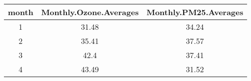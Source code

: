 \documentclass[]{article}
\begin{document}
\begin{longtable}[]{@{}ccc@{}}
\toprule
\begin{minipage}[b]{0.10\columnwidth}\centering\strut
month\strut
\end{minipage} & \begin{minipage}[b]{0.32\columnwidth}\centering\strut
Monthly.Ozone.Averages\strut
\end{minipage} & \begin{minipage}[b]{0.32\columnwidth}\centering\strut
Monthly.PM25.Averages\strut
\end{minipage}\tabularnewline
\midrule
\endhead
\begin{minipage}[t]{0.10\columnwidth}\centering\strut
1\strut
\end{minipage} & \begin{minipage}[t]{0.32\columnwidth}\centering\strut
31.48\strut
\end{minipage} & \begin{minipage}[t]{0.32\columnwidth}\centering\strut
34.24\strut
\end{minipage}\tabularnewline
\begin{minipage}[t]{0.10\columnwidth}\centering\strut
2\strut
\end{minipage} & \begin{minipage}[t]{0.32\columnwidth}\centering\strut
35.41\strut
\end{minipage} & \begin{minipage}[t]{0.32\columnwidth}\centering\strut
37.57\strut
\end{minipage}\tabularnewline
\begin{minipage}[t]{0.10\columnwidth}\centering\strut
3\strut
\end{minipage} & \begin{minipage}[t]{0.32\columnwidth}\centering\strut
42.4\strut
\end{minipage} & \begin{minipage}[t]{0.32\columnwidth}\centering\strut
37.41\strut
\end{minipage}\tabularnewline
\begin{minipage}[t]{0.10\columnwidth}\centering\strut
4\strut
\end{minipage} & \begin{minipage}[t]{0.32\columnwidth}\centering\strut
43.49\strut
\end{minipage} & \begin{minipage}[t]{0.32\columnwidth}\centering\strut
31.52\strut
\end{minipage}\tabularnewline

\end{longtable}
\end{document}

